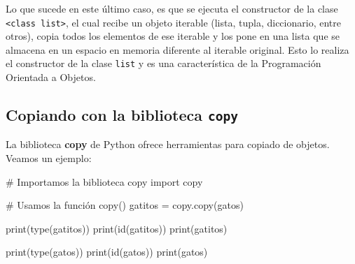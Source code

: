 \documentclass[
  spanish,
  letterpaper,
]{scrbook}
\newenvironment{Shaded}{\begin{snugshade}}{\end{snugshade}}
\newcommand{\BuiltInTok}[1]{\textcolor[rgb]{0.00,0.23,0.31}{#1}}
\newcommand{\CommentTok}[1]{\textcolor[rgb]{0.37,0.37,0.37}{#1}}
\newcommand{\ImportTok}[1]{\textcolor[rgb]{0.00,0.46,0.62}{#1}}
\newcommand{\NormalTok}[1]{\textcolor[rgb]{0.00,0.23,0.31}{#1}}
\newcommand{\OperatorTok}[1]{\textcolor[rgb]{0.37,0.37,0.37}{#1}}
\theoremstyle{definition}
\theoremstyle{remark}
\begin{document}
\begin{tcolorbox}[enhanced jigsaw, colframe=quarto-callout-note-color-frame, opacityback=0, toprule=.15mm, colback=white, coltitle=black, leftrule=.75mm, arc=.35mm, breakable, left=2mm, bottomtitle=1mm, rightrule=.15mm, bottomrule=.15mm, colbacktitle=quarto-callout-note-color!10!white, toptitle=1mm, titlerule=0mm, opacitybacktitle=0.6, title=\textcolor{quarto-callout-note-color}{\faInfo}\hspace{0.5em}{Nota.}]

Lo que sucede en este último caso, es que se ejecuta el constructor de
la clase
\texttt{\textless{}class\ \textquotesingle{}list\textquotesingle{}\textgreater{}},
el cual recibe un objeto iterable (lista, tupla, diccionario, entre
otros), copia todos los elementos de ese iterable y los pone en una
lista que se almacena en un espacio en memoria diferente al iterable
original. Esto lo realiza el constructor de la clase \texttt{list} y es
una característica de la Programación Orientada a Objetos.

\end{tcolorbox}

\subsection{\texorpdfstring{Copiando con la biblioteca
\texttt{copy}}{Copiando con la biblioteca copy}}\label{copiando-con-la-biblioteca-copy}

La biblioteca \textbf{copy} de Python ofrece herramientas para copiado
de objetos. Veamos un ejemplo:

\begin{Shaded}
\begin{Highlighting}[]
\CommentTok{\# Importamos la biblioteca copy}
\ImportTok{import}\NormalTok{ copy}

\CommentTok{\# Usamos la función copy()}
\NormalTok{gatitos }\OperatorTok{=}\NormalTok{ copy.copy(gatos)}
\end{Highlighting}
\end{Shaded}

\begin{Shaded}
\begin{Highlighting}[]
\BuiltInTok{print}\NormalTok{(}\BuiltInTok{type}\NormalTok{(gatitos))}
\BuiltInTok{print}\NormalTok{(}\BuiltInTok{id}\NormalTok{(gatitos))}
\BuiltInTok{print}\NormalTok{(gatitos)}

\BuiltInTok{print}\NormalTok{(}\BuiltInTok{type}\NormalTok{(gatos))}
\BuiltInTok{print}\NormalTok{(}\BuiltInTok{id}\NormalTok{(gatos))}
\BuiltInTok{print}\NormalTok{(gatos)}
\end{Highlighting}
\end{Shaded}
\end{document}
